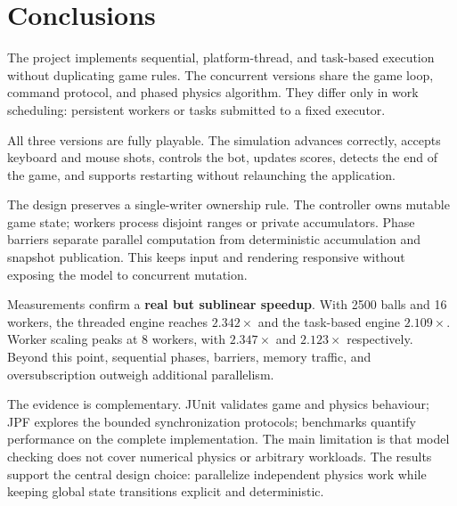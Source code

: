 \clearpage
\section{Conclusions}

The project implements sequential, platform-thread, and task-based execution
without duplicating game rules. The concurrent versions share the game loop,
command protocol, and phased physics algorithm. They differ only in work
scheduling: persistent workers or tasks submitted to a fixed executor.

All three versions are fully playable. The simulation advances correctly,
accepts keyboard and mouse shots, controls the bot, updates scores, detects the
end of the game, and supports restarting without relaunching the application.

The design preserves a single-writer ownership rule. The controller owns mutable game
state; workers process disjoint ranges or private accumulators. Phase barriers
separate parallel computation from deterministic accumulation and snapshot
publication. This keeps input and rendering responsive without exposing the
model to concurrent mutation.

Measurements confirm a \textbf{real but sublinear speedup}. With 2500 balls and
16 workers, the threaded engine reaches $2.342\times$ and the task-based engine
$2.109\times$. Worker scaling peaks at 8 workers, with $2.347\times$ and
$2.123\times$ respectively. Beyond this point, sequential phases, barriers,
memory traffic, and oversubscription outweigh additional parallelism.

The evidence is complementary. JUnit validates game and physics behaviour; JPF
explores the bounded synchronization protocols; benchmarks quantify performance
on the complete implementation. The main limitation is that model checking
does not cover numerical physics or arbitrary workloads. The
results support the central design choice: parallelize independent physics work
while keeping global state transitions explicit and deterministic.
